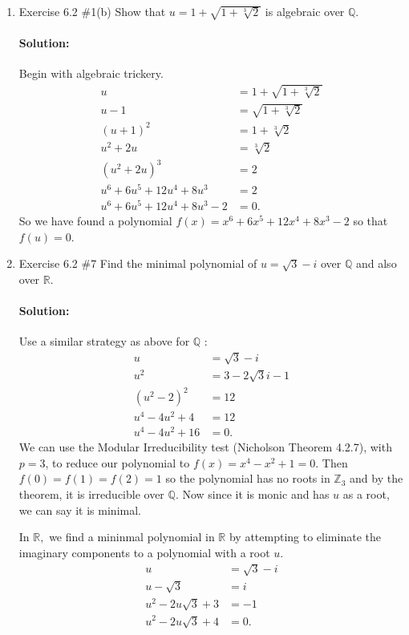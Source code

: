 \documentclass{article}
\begin{document}
\begin{enumerate} 

    \item Exercise 6.2 \#1(b) Show that $u=1+\sqrt{1+\sqrt[3]{2}}$ is algebraic over $\mathbb{Q}.$

        \paragraph{Solution:} Begin with algebraic trickery.
        \begin{align*}
            u&=1+\sqrt{1+\sqrt[3]{2}}\\
            u-1&= \sqrt{1+\sqrt[3]{2}} \\
            (u+1)^2&= 1+\sqrt[3]{2}  \\
            u^2+2u&= \sqrt[3]{2}  \\
            (u^2+2u)^3&= 2 \\
            u^6 + 6 u^5 + 12 u^4 + 8 u^3&= 2 \\
            u^6 + 6 u^5 + 12 u^4 + 8 u^3-2&= 0 
        .\end{align*}
        So we have found a polynomial $f(x)= x^6 + 6 x^5 + 12 x^4 + 8 x^3-2$ so that $f(u)=0$.

\item Exercise 6.2 \#7 Find the minimal polynomial of $u=\sqrt{3}-i$ over $\mathbb{Q}$ and also over
$\mathbb{R}.$

\paragraph{Solution: }
Use a similar strategy as above for $\mathbb{Q}$ :
\begin{align*}
    u&= \sqrt{3} -i \\
    u^2&= 3-2\sqrt{3} i-1 \\
    (u^2-2)^2&= 12 \\
    u^{4}-4u^2+4&= 12 \\
    u^{4}-4u^2+16&= 0 
.\end{align*}
We can use the Modular Irreducibility test (Nicholson Theorem 4.2.7), with $p=3$, to reduce our polynomial
to $f(x)=x^4-x^2+1=0$. Then $f(0)=f(1)=f(2)=1$ so the polynomial has no roots in  $\mathbb{Z}_3$ and by the theorem, 
it is irreducible over $\mathbb{Q}$. Now since it is monic and has $u$ as a root, we can say it is minimal.

In $\mathbb{R},$ we find a mininmal polynomial in $\mathbb{R}$ by attempting to eliminate the imaginary components to a polynomial with a root $u$.
\begin{align*}
    u&= \sqrt{3}-i  \\
    u-\sqrt{3} &= i \\
    u^2-2u\sqrt{3} +3&= -1 \\
    u^2-2u\sqrt{3} +4&=0
.\end{align*}


\end{enumerate}
\end{document}
